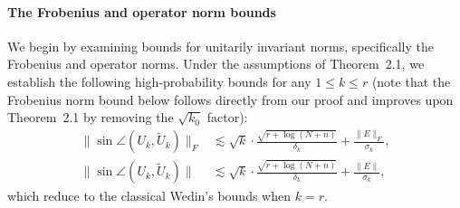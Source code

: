 \documentclass[reqno]{amsart}
\theoremstyle{plain}
\theoremstyle{definition}
\begin{document}
\medskip

\paragraph*{\textbf{The Frobenius and operator norm bounds}} We begin by examining bounds for unitarily invariant norms, specifically the Frobenius and operator norms. Under the assumptions of Theorem~2.1, we establish the following high-probability bounds for any $1 \leq k \le r$ (note that the Frobenius norm bound below follows directly from our proof and improves upon Theorem~2.1 by removing the $\sqrt{k_0}$ factor):
\begin{align}
\|\sin \angle (U_k, \widetilde{U}_k)\|_F &\lesssim \sqrt{k} \cdot \frac{\sqrt{r + \log(N+n)}}{\delta_k} + \frac{\|E\|_F}{\sigma_k}, \label{eq:Frobnorm} \\
\|\sin \angle (U_k, \widetilde{U}_k)\| &\lesssim \sqrt{k} \cdot \frac{\sqrt{r + \log(N+n)}}{\delta_k} + \frac{\|E\|}{\sigma_k}, \label{eq:opnorm}
\end{align}
which reduce to the classical Wedin's bounds when $k = r$. 
\end{document}
